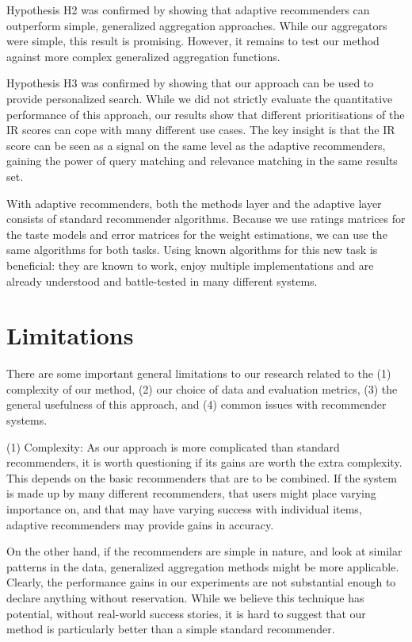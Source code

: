 Hypothesis H2 was confirmed by showing that adaptive recommenders
can outperform simple, generalized aggregation approaches.
While our aggregators were simple,
this result is promising.
However, it remains to test our method
against more complex generalized aggregation functions.

Hypothesis H3 was confirmed by showing that our approach
can be used to provide personalized search.
While we did not strictly evaluate the quantitative performance
of this approach, our results show that different
prioritisations of the IR scores can cope with many different use cases.
The key insight is that the IR score can be seen as a signal
on the same level as the adaptive recommenders,
gaining the power of query matching and relevance matching
in the same results set.

With adaptive recommenders, both the methods layer and the adaptive layer consists of standard recommender algorithms.
Because we use ratings matrices for the taste models and error matrices for the weight estimations,
we can use the same algorithms for both tasks.
Using known algorithms for this new task is beneficial:
they are known to work, enjoy multiple implementations
and are already understood and battle-tested in many different systems.


\section{Limitations}

There are some important general limitations to our research
related to the 
(1) complexity of our method, 
(2) our choice of data and evaluation metrics, 
(3) the general usefulness of this approach, and
(4) common issues with recommender systems.

(1) Complexity: As our approach is more complicated than standard recommenders,
it is worth questioning if its gains are worth the extra complexity.
This depends on the basic recommenders that are to be combined.
If the system is made up by many different recommenders,
that users might place varying importance on,
and that may have varying success with individual items,
adaptive recommenders may provide gains in accuracy.

On the other hand, if the recommenders are simple in nature,
and look at similar patterns in the data,
generalized aggregation methods might be more applicable.
Clearly, the performance gains in our experiments
are not substantial enough to declare anything without reservation.
While we believe this technique has potential,
without real-world success stories, it is hard
to suggest that our method is particularly better
than a simple standard recommender.

